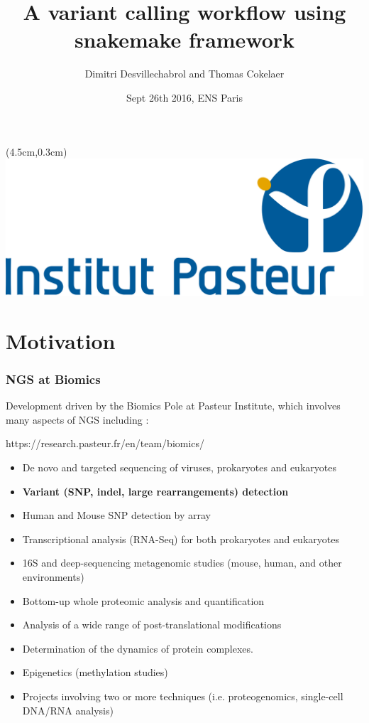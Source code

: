\documentclass{beamer}
\title{A variant calling workflow using snakemake framework}
\author[D.Desvillechabrol \& T.Cokelaer]{Dimitri Desvillechabrol and Thomas Cokelaer}
\institute{Institut Pasteur}
\date{Sept 26th 2016, ENS Paris}
\begin{document}

\begin{frame}[plain]
    \titlepage
    \begin{textblock*}{5cm}(4.5cm,0.3cm)
        \includegraphics[scale=0.09]{images/Institut_Pasteur.png}
    \end{textblock*}
\end{frame}


\section{Motivation}

\begin{frame}
 \frametitle{NGS at Biomics}
 
 Development driven by the Biomics Pole at Pasteur Institute, which involves
 many aspects of NGS including :
 
 \tiny
 \begin{block}{https://research.pasteur.fr/en/team/biomics/}
  \begin{itemize}
  \item De novo and targeted sequencing of viruses, prokaryotes and eukaryotes
  \item \textbf{Variant (SNP, indel, large rearrangements) detection}
  \item Human and Mouse SNP detection by array
  \item Transcriptional analysis (RNA-Seq) for both prokaryotes and eukaryotes
  \item 16S and deep-sequencing metagenomic studies (mouse, human, and other environments)
  \item Bottom-up whole proteomic analysis and quantification
  \item Analysis of a wide range of post-translational modifications
  \item Determination of the dynamics of protein complexes.
  \item Epigenetics (methylation studies)
  \item Projects involving two or more techniques (i.e. proteogenomics, single-cell DNA/RNA analysis)
  \end{itemize}
 \end{block}
 \small 
\end{frame}
\end{document}
